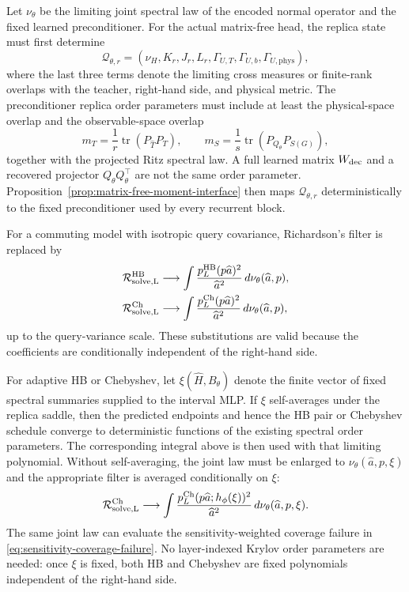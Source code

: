 \documentclass[11pt]{article}
\newcommand{\tr}{\operatorname{tr}}
\begin{document}
Let $\nu_\theta$ be the limiting joint spectral law of the encoded normal
operator and the fixed learned preconditioner.  For the actual matrix-free
head, the replica state must first determine
\[
 \mathcal Q_{\theta,r}
 =\left(\nu_H,K_r,J_r,L_r,
   \Gamma_{U,T},\Gamma_{U,b},\Gamma_{U,\mathrm{phys}}\right),
\]
where the last three terms denote the limiting cross measures or finite-rank
overlaps with the teacher, right-hand side, and physical metric.  The
preconditioner replica order parameters must include at least the
physical-space overlap and the observable-space overlap
\[
 m_T=\frac1r\tr(P_{\widehat T}P_T),
 \qquad
 m_S=\frac1s\tr(P_{Q_\theta}P_{S(G)}),
\]
together with the projected Ritz spectral law.  A full learned matrix
$W_{\rm dec}$ and a recovered projector $Q_\theta Q_\theta^\top$ are not the
same order parameter.  Proposition~\ref{prop:matrix-free-moment-interface}
then maps \(\mathcal Q_{\theta,r}\) deterministically to the fixed
preconditioner used by every recurrent block.

For a commuting model with isotropic query covariance, Richardson's filter is
replaced by
\begin{align*}
 \mathcal R_{\rm solve,L}^{\rm HB}
 &\longrightarrow
 \int \frac{p_L^{\rm HB}(p\widehat a)^2}{\widehat a^2}
 \,d\nu_\theta(\widehat a,p),\\
 \mathcal R_{\rm solve,L}^{\rm Ch}
 &\longrightarrow
 \int \frac{p_L^{\rm Ch}(p\widehat a)^2}{\widehat a^2}
 \,d\nu_\theta(\widehat a,p),
\end{align*}
up to the query-variance scale.  These substitutions are valid because the
coefficients are conditionally independent of the right-hand side.

For adaptive HB or Chebyshev, let $\xi(\widehat H,B_\theta)$ denote the finite
vector of fixed spectral summaries supplied to the interval MLP.  If $\xi$
self-averages under the replica saddle, then the predicted endpoints and hence
the HB pair or Chebyshev schedule converge to deterministic functions of the
existing spectral order parameters.  The corresponding integral above is then
used with that limiting polynomial.  Without self-averaging, the joint law
must be enlarged to $\nu_\theta(\widehat a,p,\xi)$ and the appropriate filter
is averaged conditionally on $\xi$:
\[
 \mathcal R_{\rm solve,L}^{\rm Ch}
 \longrightarrow
 \int \frac{p_L^{\rm Ch}(p\widehat a;h_\phi(\xi))^2}
 {\widehat a^2}
 \,d\nu_\theta(\widehat a,p,\xi).
\]
The same joint law can evaluate the sensitivity-weighted coverage failure in
\eqref{eq:sensitivity-coverage-failure}.  No layer-indexed Krylov order
parameters are needed: once $\xi$ is fixed, both HB and Chebyshev are fixed
polynomials independent of the right-hand side.
\end{document}
